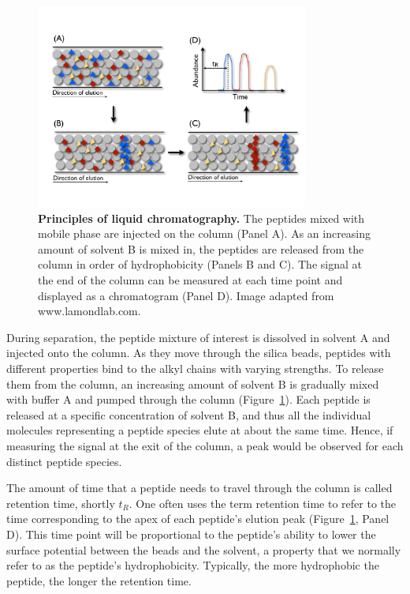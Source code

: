 \documentclass[a4paper]{article}
\begin{document}
\begin{figure}[p]
\centering
\includegraphics[trim=0.5cm 2.8cm 0.5cm 3.5cm, clip=true, width=0.8\textwidth]{img/rplc.pdf}
\caption{\label{fig:rplc} {\bf Principles of liquid chromatography.}
  The peptides mixed with mobile phase are injected on the column
  (Panel A). As an increasing amount of solvent B is mixed in, the
  peptides are released from the column in order of hydrophobicity
  (Panels B and C). The signal at the end of the column can be
  measured at each time point and displayed as a chromatogram (Panel
  D). Image adapted from www.lamondlab.com.}
\vspace{-7pt}
\end{figure}

During separation, the peptide mixture of interest is dissolved in
solvent A and injected onto the column. As they move through the
silica beads, peptides with different properties bind to the alkyl
chains with varying strengths. To release them from the column, an
increasing amount of solvent B is gradually mixed with buffer A and
pumped through the column (Figure~\ref{fig:rplc}). Each peptide is
released at a specific concentration of solvent B, and thus all the
individual molecules representing a peptide species elute at about the
same time.  Hence, if measuring the signal at the exit of the column,
a peak would be observed for each distinct peptide species.

The amount of time that a peptide needs to travel through the column
is called retention time, shortly $t_R$. One often uses the term
retention time to refer to the time corresponding to the apex of each
peptide's elution peak (Figure~\ref{fig:rplc}, Panel D). This time
point will be proportional to the peptide's ability to lower the
surface potential between the beads and the solvent, a property that
we normally refer to as the peptide's hydrophobicity.  Typically, the
more hydrophobic the peptide, the longer the retention time.
\end{document}
